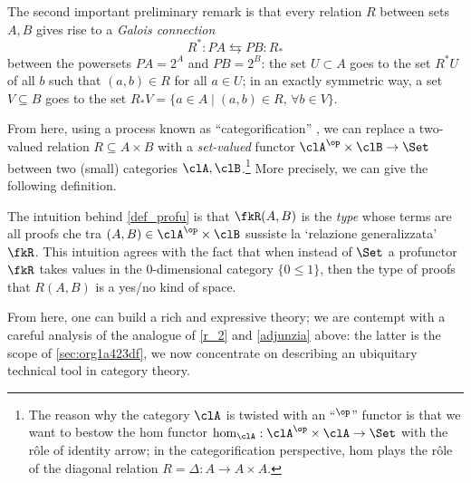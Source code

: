 \documentclass[a4paper]{../birkjour}
\begin{document}
The second important preliminary remark is that every relation $R$ between sets $A,B$ gives rise to a \emph{Galois connection} 
\[R^* :PA \leftrightarrows PB : R_* \label{adjunzia} \]
between the powersets $PA=2^A$ and $PB = 2^B$: the set $U\subset A$ goes to the set $R^*U$ of all $b$ such that $(a,b)\in R$ for all $a\in U$; in an exactly symmetric way, a set $V\subseteq B$ goes to the set $R_*V = \{a\in A\mid (a,b) \in R,\, \forall b\in V\}$.

From here, using a process known as ``categorification'' \cite{baez_catego}, we can replace a two-valued relation $R\subseteq A\times B$ with a \emph{set-valued} functor $\clA^\op\times\clB \to \Set$ between two (small) categories $\clA,\clB$.\footnote{The reason why the category $\clA$ is twisted with an ``$^\op$'' functor is that we want to bestow the hom functor $\hom_{\clA} : \clA^\op\times\clA \to \Set$ with the r\^ole of identity arrow; in the categorification perspective, hom plays the r\^ole of the diagonal relation $R=\Delta : A\to A\times A$.} More precisely, we can give the following definition.
\begin{definition}[Profunctor]\label{def_profu}
  
\end{definition}
The intuition behind \autoref{def_profu} is that $\fkR(A,B)$ is the \emph{type} whose terms are all proofs che tra $(A,B)\in\clA^\op\times\clB$ sussiste la `relazione generalizzata' $\fkR$. This intuition agrees with the fact that when instead of $\Set$ a profunctor $\fkR$ takes values in the 0-dimensional category $\{0\le 1\}$, then the type of proofs that $R(A,B)$ is a yes/no kind of space.

From here, one can build a rich and expressive theory; we are contempt with a careful analysis of the analogue of \ref{r_2} and \eqref{adjunzia} above: the latter is the scope of \autoref{sec:org1a423df}, we now concentrate on describing an ubiquitary technical tool in category theory.
\end{document}
